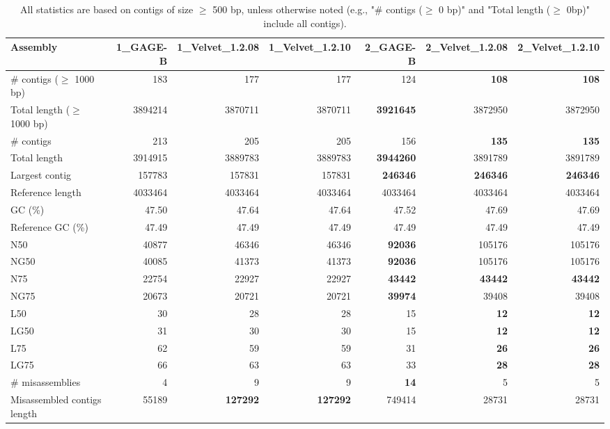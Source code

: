 \documentclass[12pt,a4paper]{article}
\begin{document}
\begin{table}[ht]
\begin{center}
\caption{All statistics are based on contigs of size $\geq$ 500 bp, unless otherwise noted (e.g., "\# contigs ($\geq$ 0 bp)" and "Total length ($\geq$ 0bp)" include all contigs).}
\begin{tabular}{|l*{6}{|r}|}
\hline
Assembly & 1\_GAGE-B & 1\_Velvet\_1.2.08 & 1\_Velvet\_1.2.10 & 2\_GAGE-B & 2\_Velvet\_1.2.08 & 2\_Velvet\_1.2.10 \\ \hline
\# contigs ($\geq$ 1000 bp) & 183 & 177 & 177 & 124 & {\bf 108} & {\bf 108} \\ \hline
Total length ($\geq$ 1000 bp) & 3894214 & 3870711 & 3870711 & {\bf 3921645} & 3872950 & 3872950 \\ \hline
\# contigs & 213 & 205 & 205 & 156 & {\bf 135} & {\bf 135} \\ \hline
Total length & 3914915 & 3889783 & 3889783 & {\bf 3944260} & 3891789 & 3891789 \\ \hline
Largest contig & 157783 & 157831 & 157831 & {\bf 246346} & {\bf 246346} & {\bf 246346} \\ \hline
Reference length & 4033464 & 4033464 & 4033464 & 4033464 & 4033464 & 4033464 \\ \hline
GC (\%) & 47.50 & 47.64 & 47.64 & 47.52 & 47.69 & 47.69 \\ \hline
Reference GC (\%) & 47.49 & 47.49 & 47.49 & 47.49 & 47.49 & 47.49 \\ \hline
N50 & 40877 & 46346 & 46346 & {\bf 92036} & 105176 & 105176 \\ \hline
NG50 & 40085 & 41373 & 41373 & {\bf 92036} & 105176 & 105176 \\ \hline
N75 & 22754 & 22927 & 22927 & {\bf 43442} & {\bf 43442} & {\bf 43442} \\ \hline
NG75 & 20673 & 20721 & 20721 & {\bf 39974} & 39408 & 39408 \\ \hline
L50 & 30 & 28 & 28 & 15 & {\bf 12} & {\bf 12} \\ \hline
LG50 & 31 & 30 & 30 & 15 & {\bf 12} & {\bf 12} \\ \hline
L75 & 62 & 59 & 59 & 31 & {\bf 26} & {\bf 26} \\ \hline
LG75 & 66 & 63 & 63 & 33 & {\bf 28} & {\bf 28} \\ \hline
\# misassemblies & 4 & 9 & 9 & {\bf 14} & 5 & 5 \\ \hline
Misassembled contigs length & 55189 & {\bf 127292} & {\bf 127292} & 749414 & 28731 & 28731 \\ \hline

\end{tabular}
\end{center}
\end{table}
\end{document}
